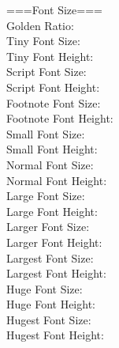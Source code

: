 {  ===Font Size=== \\
  Golden Ratio: \goldenratio \\
  Tiny Font Size: \tinyfontsize \\
  Tiny Font Height: \tinyfontheight \\
  Script Font Size: \scriptfontsize \\
  Script Font Height: \scriptfontheight \\
  Footnote Font Size: \footnotefontsize \\
  Footnote Font Height: \footnotefontheight \\
  Small Font Size: \smallfontsize \\
  Small Font Height: \smallfontheight \\
  Normal Font Size: \normalfontsize \\
  Normal Font Height: \normalfontheight \\
  Large Font Size: \largefontsize \\
  Large Font Height: \largefontheight \\
  Larger Font Size: \largerfontsize \\
  Larger Font Height: \largerfontheight \\
  Largest Font Size: \largestfontsize \\
  Largest Font Height: \largestfontheight \\
  Huge Font Size: \hugefontsize \\
  Huge Font Height: \hugefontheight \\
  Hugest Font Size: \hugestfontsize \\
  Hugest Font Height: \hugestfontheight
}